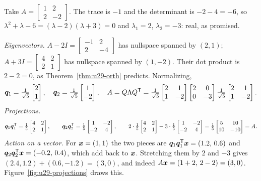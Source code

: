\begin{example}\label{ex:u29-spectral}
Take $A=\begin{bmatrix}1&2\\2&-2\end{bmatrix}$. The trace is $-1$ and the determinant is
$-2-4=-6$, so $\lambda^2+\lambda-6=(\lambda-2)(\lambda+3)=0$ and $\lambda_1=2$, $\lambda_2=-3$:
real, as promised.

\emph{Eigenvectors.} $A-2I=\left[\begin{smallmatrix}-1&2\\2&-4\end{smallmatrix}\right]$ has nullspace
spanned by $(2,1)$; $A+3I=\left[\begin{smallmatrix}4&2\\2&1\end{smallmatrix}\right]$ has nullspace
spanned by $(1,-2)$. Their dot product is $2-2=0$, as Theorem~\ref{thm:u29-orth} predicts.
Normalizing,
\[
  \boldsymbol{q}_1=\tfrac{1}{\sqrt5}\begin{bmatrix}2\\1\end{bmatrix},\quad
  \boldsymbol{q}_2=\tfrac{1}{\sqrt5}\begin{bmatrix}1\\-2\end{bmatrix},\quad
  A=Q\Lambda Q^{\mathsf{T}}=\tfrac{1}{\sqrt5}\begin{bmatrix}2&1\\1&-2\end{bmatrix}
  \begin{bmatrix}2&0\\0&-3\end{bmatrix}
  \tfrac{1}{\sqrt5}\begin{bmatrix}2&1\\1&-2\end{bmatrix}.
\]
\emph{Projections.}
\[
  \boldsymbol{q}_1\boldsymbol{q}_1^{\mathsf{T}}=\tfrac15\begin{bmatrix}4&2\\2&1\end{bmatrix},\qquad
  \boldsymbol{q}_2\boldsymbol{q}_2^{\mathsf{T}}=\tfrac15\begin{bmatrix}1&-2\\-2&4\end{bmatrix},\qquad
  2\cdot\tfrac15\begin{bmatrix}4&2\\2&1\end{bmatrix}-3\cdot\tfrac15\begin{bmatrix}1&-2\\-2&4\end{bmatrix}
  =\tfrac15\begin{bmatrix}5&10\\10&-10\end{bmatrix}=A .
\]
\emph{Action on a vector.} For $\boldsymbol{x}=(1,1)$ the two pieces are
$\boldsymbol{q}_1\boldsymbol{q}_1^{\mathsf{T}}\boldsymbol{x}=(1.2,\,0.6)$ and $\boldsymbol{q}_2\boldsymbol{q}_2^{\mathsf{T}}\boldsymbol{x}=(-0.2,\,0.4)$, which add back to
$\boldsymbol{x}$. Stretching them by $2$ and $-3$ gives $(2.4,1.2)+(0.6,-1.2)=(3,0)$, and indeed
$A\boldsymbol{x}=(1+2,\,2-2)=(3,0)$. Figure~\ref{fig:u29-projections} draws this.


\end{example}
